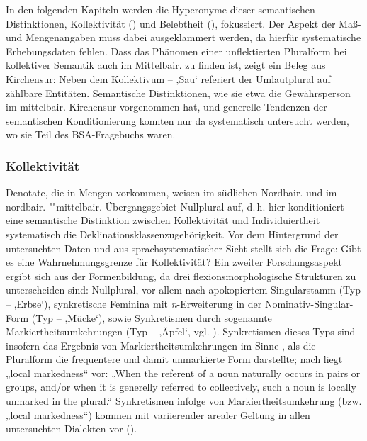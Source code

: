 In den folgenden Kapiteln werden die Hyperonyme dieser semantischen Distinktionen, Kollektivität () und Belebtheit (), fokussiert. Der As\-pekt der Maß- und Mengenangaben muss dabei ausgeklammert werden, da hierfür systematische Erhebungsdaten fehlen. Dass das Phänomen einer unflektierten Pluralform bei kollektiver Semantik auch im Mittelbair. zu finden ist, zeigt ein Beleg aus Kirchensur: Neben dem Kollektivum  --  ‚Sau‘ referiert der Umlautplural  auf zählbare Entitäten. Semantische Distinktionen, wie sie etwa die Gewährsperson im mittelbair. Kirchensur vorgenommen hat, und generelle Tendenzen der semantischen Konditionierung konnten nur da systematisch untersucht werden, wo sie Teil des BSA-Fragebuchs waren.

\subsubsection{Kollektivität}
\label{sec:8.3.2.1}
Denotate, die in Mengen vorkommen, weisen im südlichen Nordbair. und im nord\-bair.-""mit\-tel\-bair. Übergangsgebiet Nullplural auf, d.\,h. hier konditioniert eine semantische Distinktion zwischen Kollektivität und Individuiertheit systematisch die Deklinationsklassenzugehörigkeit. Vor dem Hintergrund der untersuchten Daten und aus sprachsystematischer Sicht stellt sich die Frage: Gibt es eine Wahrnehmungsgrenze für Kollektivität? Ein zweiter Forschungsaspekt ergibt sich aus der Formenbildung, da drei flexionsmorphologische Strukturen zu unterscheiden sind: Nullplural, vor allem nach apokopiertem Singularstamm (Typ  --  ‚Erbse‘), synkretische Feminina mit \textit{n}{}-Erweiterung in der Nominativ-Singular-Form (Typ  --  ‚Mücke‘), sowie Synkretismen durch sogenannte Markiertheitsumkehrungen (Typ  --  ‚Äpfel‘, vgl. \citealt[54]{Roth1940}). Synkretismen dieses Typs sind insofern das Ergebnis von Markiertheitsumkehrungen im Sinne , als die Pluralform die frequentere und damit unmarkierte Form darstellte; nach \citet[835]{Tiersma1982} liegt „local markedness“ vor: „When the referent of a noun naturally occurs in pairs or groups, and/or when it is generelly referred to collectively, such a noun is locally unmarked in the plural.“ Synkretismen infolge von Markiertheitsumkehrung (bzw. „local markedness“) kommen mit variierender arealer Geltung in allen untersuchten Dialekten vor ().

